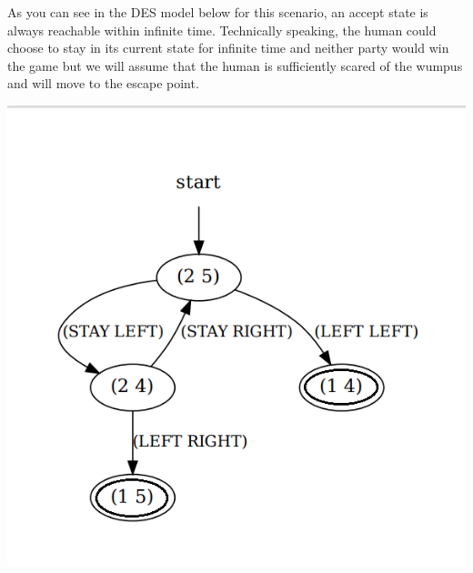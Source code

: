 \documentclass[12pt,letterpaper]{ntdhw}
\begin{document}
\begin{enumerate}
    \begin{center}
      \label{fig:map4}
    \end{center}
As you can see in the DES model below for this scenario, an accept state is always reachable within infinite time. Technically speaking, the human could choose to stay in its current state for infinite time and neither party would win the game but we will assume that the human is sufficiently scared of the wumpus and will move to the escape point.
\begin{center}
\includegraphics[scale=0.5]{Q4_graphviz.png}
\end{center}
\end{enumerate}
\end{document}
